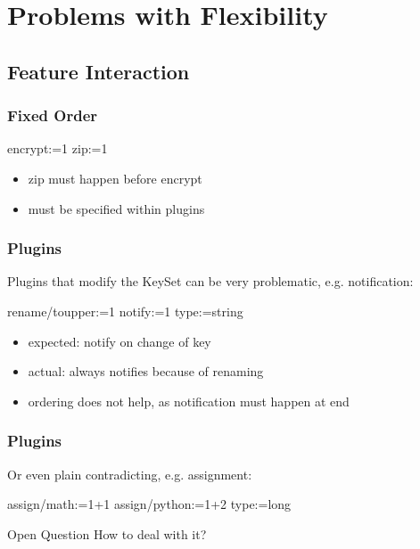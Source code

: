 \section{Problems with Flexibility}

\subsection{Feature Interaction}

\begin{frame}[fragile]
	\frametitle{Fixed Order}

	\begin{code}
	  encrypt:=1
	  zip:=1
	\end{code}

	\begin{itemize}
	\item zip must happen before encrypt
	\item must be specified within plugins
	\end{itemize}
\end{frame}

\begin{frame}[fragile]
	\frametitle{Plugins}

	Plugins that modify the KeySet can be very problematic, e.g. notification:
	\begin{code}
	  rename/toupper:=1
	  notify:=1
	  type:=string
	\end{code}

	\begin{itemize}
	\item expected: notify on change of key
	\item actual: always notifies because of renaming
	\item ordering does not help, as notification must happen at end
	\end{itemize}
\end{frame}

\begin{frame}[fragile]
	\frametitle{Plugins}

	Or even plain contradicting, e.g. assignment:
	\begin{code}
	  assign/math:=1+1
	  assign/python:=1+2
	  type:=long
	\end{code}

	\begin{alertblock}{Open Question}
	How to deal with it?
	\end{alertblock}
\end{frame}


